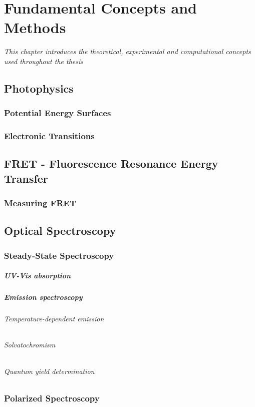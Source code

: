 \chapter{Fundamental Concepts and Methods}
\label{chap:Methodologies}
\textit{This chapter introduces the theoretical, experimental and computational concepts used throughout the thesis}
\vspace{2ex}\vfill
\minitoc
\newpage

\section{Photophysics}
\subsection{Potential Energy Surfaces}
\subsection{Electronic Transitions}

\section{FRET - Fluorescence Resonance Energy Transfer}
\subsection{Measuring FRET}

\section{Optical Spectroscopy}
\subsection{Steady-State Spectroscopy}
\paragraph{UV-Vis absorption}
\paragraph{Emission spectroscopy}
\subparagraph{Temperature-dependent emission}
\subparagraph{Solvatochromism}
\subparagraph{Quantum yield determination}

\subsection{Polarized Spectroscopy}
